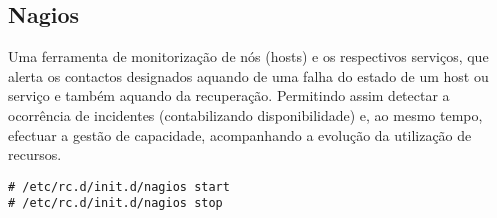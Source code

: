 \subsection{Nagios}

Uma ferramenta de monitorização de nós (hosts) e os respectivos serviços, que alerta os contactos designados aquando de uma falha do estado de um host ou serviço e também aquando da recuperação. Permitindo assim detectar a ocorrência de incidentes (contabilizando disponibilidade) e, ao mesmo tempo, efectuar a gestão de capacidade, acompanhando a evolução da utilização de recursos.

\begin{Verbatim}[commandchars=\\\{\}]
# /etc/rc.d/init.d/nagios start
# /etc/rc.d/init.d/nagios stop
\end{Verbatim}


